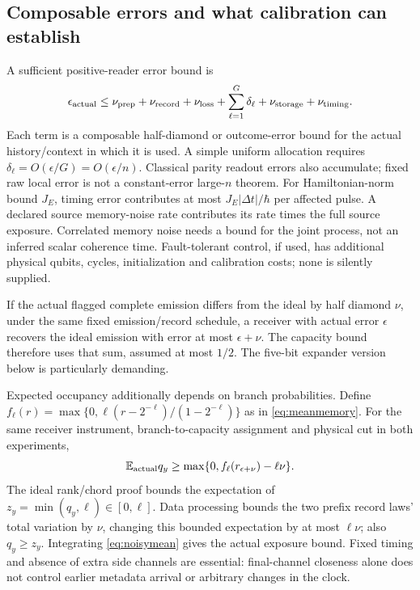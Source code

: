 \documentclass[11pt]{article}
\begin{document}
\subsection{Composable errors and what calibration can establish}
A sufficient positive-reader error bound is
\begin{equation}
 \epsilon_{\rm actual}\le\nu_{\rm prep}+\nu_{\rm record}+\nu_{\rm loss}
 +\sum_{\ell=1}^{G}\delta_\ell+\nu_{\rm storage}+\nu_{\rm timing}.
 \label{eq:errors}
\end{equation}
Each term is a composable half-diamond or outcome-error bound for the actual
history/context in which it is used. A simple uniform allocation requires
$\delta_\ell=O(\epsilon/G)=O(\epsilon/n)$. Classical parity readout errors
also accumulate; fixed raw local error is not a constant-error large-$n$
theorem. For Hamiltonian-norm bound $J_E$, timing error contributes at
most $J_E|\Delta t|/\hbar$ per affected pulse. A declared source memory-noise
rate contributes its rate times the full source exposure. Correlated memory
noise needs a bound for the joint process, not an inferred scalar coherence
time. Fault-tolerant control, if used, has additional physical qubits, cycles,
initialization and calibration costs; none is silently supplied.

If the actual flagged complete emission differs from the ideal by half diamond
$\nu$, under the same fixed emission/record schedule, a receiver with actual
error $\epsilon$ recovers the ideal emission with error at most $\epsilon+\nu$.
The capacity bound therefore uses that sum, assumed at most $1/2$. The
five-bit expander version below is particularly demanding.

Expected occupancy additionally depends on branch probabilities. Define
$f_\ell(r)=\max\{0,\ell(r-2^{-\ell})/(1-2^{-\ell})\}$ as in
\eqref{eq:meanmemory}. For the same receiver instrument, branch-to-capacity
assignment and physical cut in both experiments,
\begin{equation}
 \mathbb E_{\rm actual}q_y\ge
 \max\{0,f_\ell(r_{\epsilon+\nu})-\ell\nu\}. \label{eq:noisymean}
\end{equation}
The ideal rank/chord proof bounds the expectation of
$z_y=\min(q_y,\ell)\in[0,\ell]$. Data processing bounds the two prefix record
laws' total variation by $\nu$, changing this bounded expectation by at most
$\ell\nu$; also $q_y\ge z_y$. Integrating \eqref{eq:noisymean} gives the
actual exposure bound. Fixed timing and absence of extra side channels are
essential: final-channel closeness alone does not control earlier metadata
arrival or arbitrary changes in the clock.
\end{document}
